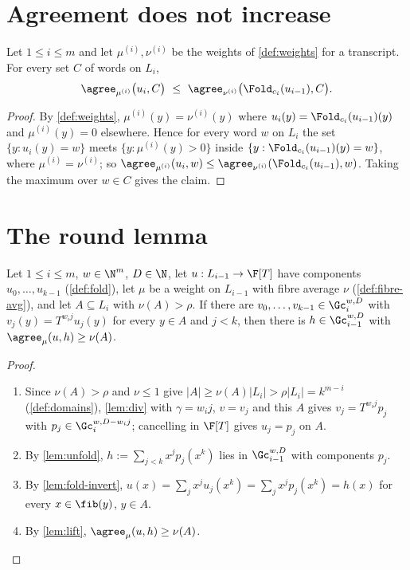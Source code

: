{{\section{Agreement does not increase}

\begin{lemma}[No increase]\label{lem:no-increase}
Let $1\le i\le m$ and let $\mu^{(i)},\nu^{(i)}$ be the weights of \ref{def:weights} for a
transcript. For every set $C$ of words on $L_i$,
\[
\agree_{\mu^{(i)}}\big(u_i,C\big)\ \le\ \agree_{\nu^{(i)}}\big(\Fold_{c_i}(u_{i-1}),C\big).
\]
\end{lemma}

\begin{proof}
By \ref{def:weights}, $\mu^{(i)}(y)=\nu^{(i)}(y)$ where
$u_i(y)=\Fold_{c_i}(u_{i-1})(y)$ and $\mu^{(i)}(y)=0$ elsewhere. Hence for every word $w$ on
$L_i$ the set $\{y:u_i(y)=w\}$ meets $\{y:\mu^{(i)}(y)>0\}$ inside
$\{y:\Fold_{c_i}(u_{i-1})(y)=w\}$, where $\mu^{(i)}=\nu^{(i)}$; so
$\agree_{\mu^{(i)}}(u_i,w)\le\agree_{\nu^{(i)}}(\Fold_{c_i}(u_{i-1}),w)$. Taking the maximum
over $w\in C$ gives the claim.
\end{proof}

\section{The round lemma}

\begin{lemma}[Descent]\label{lem:round-up}
Let $1\le i\le m$, $w\in\N^m$, $D\in\N$, let $u:L_{i-1}\to\F[T]$ have components
$u_0,\dots,u_{k-1}$ (\ref{def:fold}), let $\mu$ be a weight on $L_{i-1}$ with fibre average $\nu$
(\ref{def:fibre-avg}), and let $A\subseteq L_i$ with $\nu(A)>\rho$. If there are
$v_0,\dots,v_{k-1}\in\Gc_i^{w,D}$ with $v_j(y)=T^{w_ij}u_j(y)$ for every $y\in A$ and $j<k$, then
there is $h\in\Gc_{i-1}^{w,D}$ with $\agree_\mu(u,h)\ge\nu(A)$.
\end{lemma}

\begin{proof}\begin{enumerate}
\item Since $\nu(A)>\rho$ and $\nu\le1$ give $|A|\ge\nu(A)|L_i|>\rho|L_i|=k^{m-i}$
(\ref{def:domains}), \ref{lem:div} with $\gamma=w_ij$, $v=v_j$ and this $A$ gives $v_j=T^{w_ij}p_j$
with $p_j\in\Gc_i^{w,D-w_ij}$; cancelling in $\F[T]$ gives $u_j=p_j$ on $A$.
\item By \ref{lem:unfold}, $h:=\sum_{j<k}x^jp_j(x^k)$ lies in $\Gc_{i-1}^{w,D}$ with components
$p_j$.
\item By \ref{lem:fold-invert}, $u(x)=\sum_jx^ju_j(x^k)=\sum_jx^jp_j(x^k)=h(x)$ for every
$x\in\fib(y)$, $y\in A$.
\item By \ref{lem:lift}, $\agree_\mu(u,h)\ge\nu(A)$.
\end{enumerate}\end{proof}

}}
